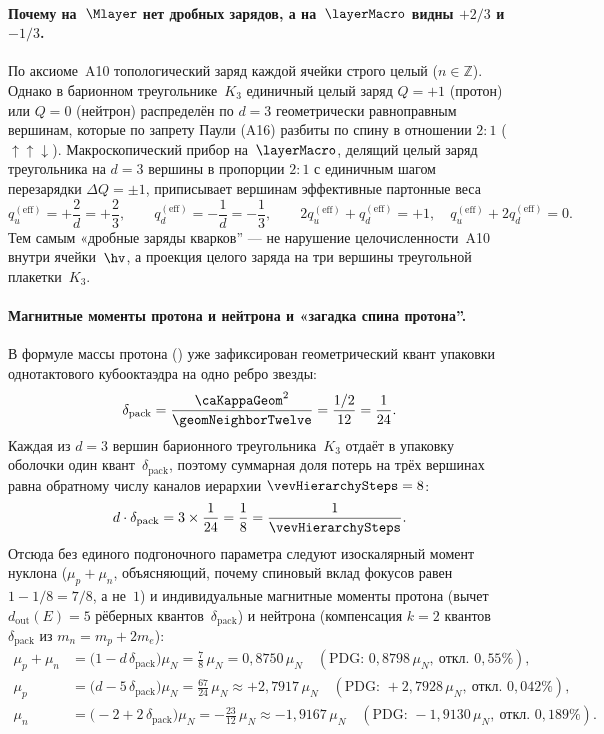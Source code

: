 \paragraph{Почему на~$\Mlayer$ нет дробных зарядов, а на~$\layerMacro$ видны $+2/3$ и $-1/3$.}
По аксиоме~A10 топологический заряд каждой ячейки строго целый ($n\in\mathbb{Z}$).
Однако в барионном треугольнике~$K_3$ единичный целый заряд $Q=+1$ (протон) или $Q=0$ (нейтрон)
распределён по $d=3$ геометрически равноправным вершинам, которые по запрету Паули (A16)
разбиты по спину в отношении $2:1$ ($\uparrow\uparrow\downarrow$).
Макроскопический прибор на~$\layerMacro$, делящий целый заряд треугольника на $d=3$ вершины в пропорции $2:1$
с единичным шагом перезарядки $\Delta Q=\pm 1$, приписывает вершинам эффективные партонные веса
\[
  q_u^{(\mathrm{eff})}=+\frac{2}{d}=+\frac{2}{3},\qquad
  q_d^{(\mathrm{eff})}=-\frac{1}{d}=-\frac{1}{3},\qquad
  2q_u^{(\mathrm{eff})}+q_d^{(\mathrm{eff})}=+1,\quad
  q_u^{(\mathrm{eff})}+2q_d^{(\mathrm{eff})}=0.
\]
Тем самым «дробные заряды кварков'' --- не нарушение целочисленности~A10 внутри ячейки~$\hv$,
а проекция целого заряда на три вершины треугольной плакетки~$K_3$.

\paragraph{Магнитные моменты протона и нейтрона и «загадка спина протона''.}
В формуле массы протона () уже зафиксирован геометрический квант упаковки однотактового кубооктаэдра
на одно ребро звезды:
\[
  \delta_{\mathrm{pack}} = \frac{\caKappaGeom^2}{\geomNeighborTwelve} = \frac{1/2}{12} = \frac{1}{24}.
\]
Каждая из $d=3$ вершин барионного треугольника~$K_3$ отдаёт в упаковку оболочки один квант~$\delta_{\mathrm{pack}}$,
поэтому суммарная доля потерь на трёх вершинах равна обратному числу каналов иерархии $\vevHierarchySteps=8$:
\[
  d\cdot\delta_{\mathrm{pack}} = 3\times\frac{1}{24} = \frac{1}{8} = \frac{1}{\vevHierarchySteps}.
\]
Отсюда без единого подгоночного параметра следуют изоскалярный момент нуклона ($\mu_p+\mu_n$, объясняющий,
почему спиновый вклад фокусов равен $1-1/8=7/8$, а не~$1$) и индивидуальные магнитные моменты протона
(вычет $d_{\mathrm{out}}(E)=5$ рёберных квантов~$\delta_{\mathrm{pack}}$) и нейтрона
(компенсация $k=2$ квантов~$\delta_{\mathrm{pack}}$ из $m_n=m_p+2m_e$):
\begin{align}
  \mu_p + \mu_n &= \bigl(1 - d\,\delta_{\mathrm{pack}}\bigr)\mu_N
    = \frac{7}{8}\,\mu_N = 0{,}8750\,\mu_N
    \quad(\text{PDG: }0{,}8798\,\mu_N,\ \text{откл.\ }0{,}55\%),\\
  \mu_p &= \bigl(d - 5\,\delta_{\mathrm{pack}}\bigr)\mu_N
    = \frac{67}{24}\,\mu_N \approx +2{,}7917\,\mu_N
    \quad(\text{PDG: }+2{,}7928\,\mu_N,\ \text{откл.\ }0{,}042\%),\\
  \mu_n &= \bigl(-2 + 2\,\delta_{\mathrm{pack}}\bigr)\mu_N
    = -\frac{23}{12}\,\mu_N \approx -1{,}9167\,\mu_N
    \quad(\text{PDG: }-1{,}9130\,\mu_N,\ \text{откл.\ }0{,}189\%).
\end{align}

